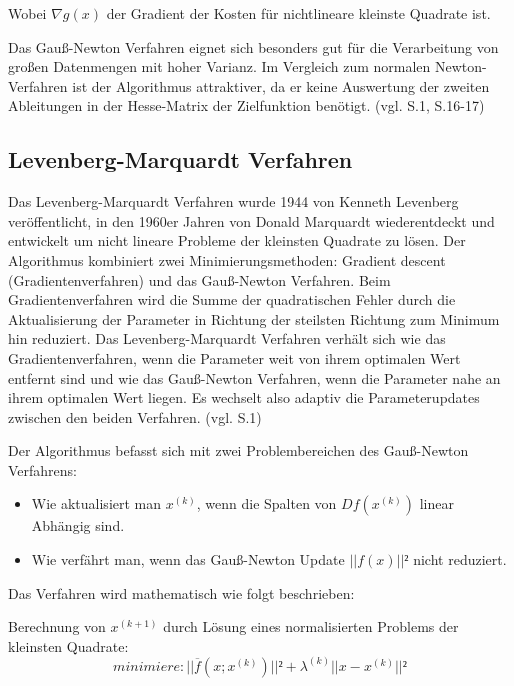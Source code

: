 Wobei $\nabla g(x)$ der Gradient der Kosten für nichtlineare kleinste Quadrate ist.

Das Gauß-Newton Verfahren eignet sich besonders gut für die Verarbeitung von großen Datenmengen mit hoher Varianz. Im Vergleich zum normalen Newton-Verfahren ist der Algorithmus attraktiver, da er keine Auswertung der zweiten Ableitungen in der Hesse-Matrix der Zielfunktion benötigt. (vgl.\cite{approx_gn} S.1, \cite{nonlinear_1} S.16-17)


\subsection{Levenberg-Marquardt Verfahren}

Das Levenberg-Marquardt Verfahren wurde 1944 von Kenneth Levenberg \cite{levenberg} veröffentlicht, in den 1960er Jahren von Donald Marquardt wiederentdeckt und entwickelt um nicht lineare Probleme der kleinsten Quadrate zu lösen. Der Algorithmus kombiniert zwei Minimierungsmethoden: \glqq Gradient descent\grqq{} (Gradientenverfahren) und das Gauß-Newton Verfahren. Beim Gradientenverfahren wird die Summe der quadratischen Fehler durch die Aktualisierung der Parameter in Richtung der steilsten Richtung zum Minimum hin reduziert. Das Levenberg-Marquardt Verfahren verhält sich wie das Gradientenverfahren, wenn die Parameter weit von ihrem optimalen Wert entfernt sind und wie das Gauß-Newton Verfahren, wenn die Parameter nahe an ihrem optimalen Wert liegen. Es wechselt also adaptiv die Parameterupdates zwischen den beiden Verfahren. (vgl. \cite{lev_mar} S.1)

Der Algorithmus befasst sich mit zwei Problembereichen des Gauß-Newton Verfahrens:

\begin{itemize}
\item Wie aktualisiert man $x^{(k)}$, wenn die Spalten von $Df(x^{(k)})$ linear Abhängig sind.

\item Wie verfährt man, wenn das Gauß-Newton Update $||f(x)||²$ nicht reduziert.
\end{itemize}

Das Verfahren wird mathematisch wie folgt beschrieben:

Berechnung von $x^{(k+1)}$ durch Lösung eines normalisierten Problems der kleinsten Quadrate:
\begin{equation}
minimiere: ||\overline{f}(x;x^{(k)})||² + \lambda^{(k)}||x-x^{(k)}||²
\end{equation}

